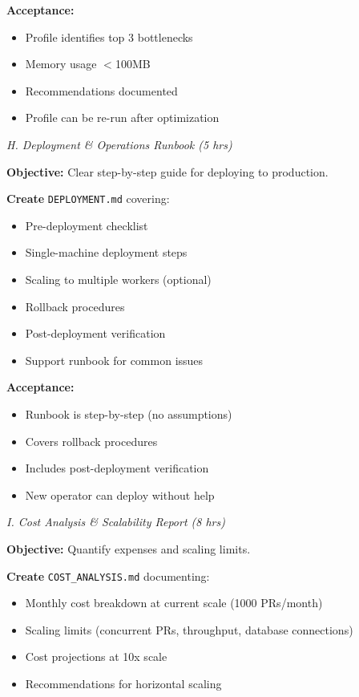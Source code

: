 \documentclass[11pt,a4paper]{article}
\begin{document}
\textbf{Acceptance:}
\begin{itemize}[leftmargin=*]
    \item[$\checkmark$] Profile identifies top 3 bottlenecks
    \item[$\checkmark$] Memory usage $<$100MB
    \item[$\checkmark$] Recommendations documented
    \item[$\checkmark$] Profile can be re-run after optimization
\end{itemize}

\textit{H. Deployment \& Operations Runbook (5 hrs)}

\textbf{Objective:} Clear step-by-step guide for deploying to production.

\textbf{Create} \texttt{DEPLOYMENT.md} covering:
\begin{itemize}[leftmargin=*]
    \item Pre-deployment checklist
    \item Single-machine deployment steps
    \item Scaling to multiple workers (optional)
    \item Rollback procedures
    \item Post-deployment verification
    \item Support runbook for common issues
\end{itemize}

\textbf{Acceptance:}
\begin{itemize}[leftmargin=*]
    \item[$\checkmark$] Runbook is step-by-step (no assumptions)
    \item[$\checkmark$] Covers rollback procedures
    \item[$\checkmark$] Includes post-deployment verification
    \item[$\checkmark$] New operator can deploy without help
\end{itemize}

\textit{I. Cost Analysis \& Scalability Report (8 hrs)}

\textbf{Objective:} Quantify expenses and scaling limits.

\textbf{Create} \texttt{COST\_ANALYSIS.md} documenting:
\begin{itemize}[leftmargin=*]
    \item Monthly cost breakdown at current scale (1000 PRs/month)
    \item Scaling limits (concurrent PRs, throughput, database connections)
    \item Cost projections at 10x scale
    \item Recommendations for horizontal scaling
\end{itemize}
\end{document}
